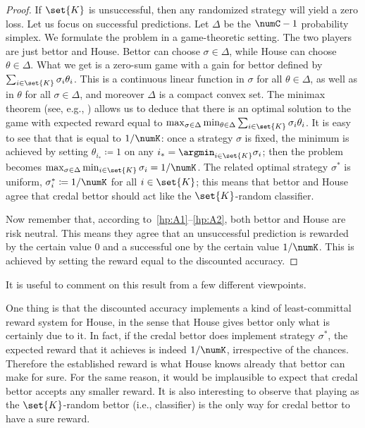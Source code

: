 \documentclass[a4paper,10pt,reqno]{amsart}
\theoremstyle{remark}
\begin{document}
\begin{proof}
If $\set{K}$ is unsuccessful, then any randomized strategy will yield a zero loss.
Let us focus on successful predictions. Let $\Delta$ be the $\numC-1$ probability simplex. We formulate the problem in a game-theoretic setting. The two players are just bettor and House. Bettor can choose $\sigma\in\Delta$, while House can choose $\theta\in\Delta$. What we get is a zero-sum game with a gain for bettor defined by $\sum_{i\in\set{K}}\sigma_i\theta_i$. This is a continuous linear function in $\sigma$ for all $\theta\in\Delta$, as well as in $\theta$ for all $\sigma\in\Delta$, and moreover $\Delta$ is a compact convex set. The minimax theorem (see, e.g., \cite[Theorem~6.7.3]{stoer1970}) allows us to deduce that there is an optimal solution to the game with expected reward equal to $\max_{\sigma\in\Delta}\min_{\theta\in\Delta}\sum_{i\in\set{K}}\sigma_i\theta_i$. It is easy to see that that is equal to $1/\numK$: once a strategy $\sigma$ is fixed, the minimum is achieved by setting $\theta_{i_*}\coloneqq 1$ on any $i_*=\argmin_{i\in\set{K}}\sigma_i$; then the problem becomes $\max_{\sigma\in\Delta}\min_{i\in\set{K}}\sigma_i=1/\numK$. The related optimal strategy $\sigma^*$ is uniform, $\sigma_i^*\coloneqq 1/\numK$ for all $i\in\set{K}$; this means that bettor and House agree that credal bettor should act like the $\set{K}$-random classifier.

Now remember that, according to~\ref{hp:A1}--\ref{hp:A2}, both bettor and House are risk neutral. This means they agree that an unsuccessful prediction is rewarded by the certain value $0$ and a successful one by the certain value $1/\numK$. This is achieved by setting the reward equal to the discounted accuracy. 
\end{proof}


It is useful to comment on this result from a few different viewpoints. 

One thing is that the discounted accuracy implements a kind of least-committal reward system for House, in the sense that House gives bettor only what is certainly due to it. In fact, if the credal bettor does implement strategy $\sigma^*$, the expected reward that it achieves is indeed $1/\numK$, irrespective of the chances. Therefore the established reward is what House knows already that bettor can make for sure. For the same reason, it would be implausible to expect that credal bettor accepts any smaller reward. It is also interesting to observe that playing as the $\set{K}$-random bettor (i.e., classifier) is the only way for credal bettor to have a sure reward.
\end{document}

